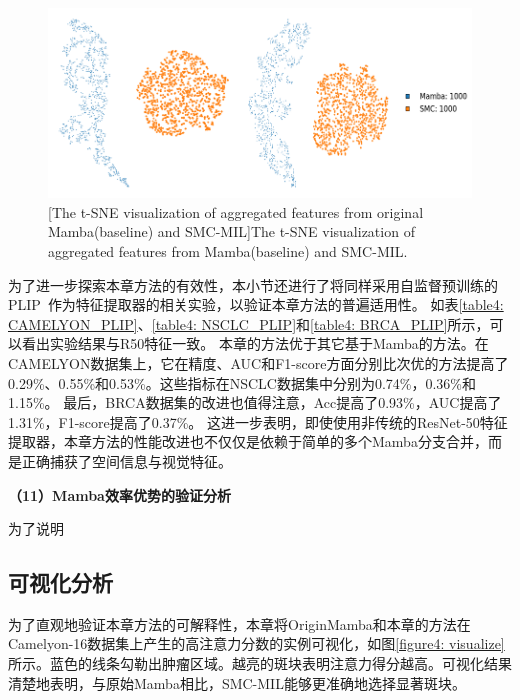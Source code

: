 \begin{figure}[h!]
  \centering
  \includegraphics[width=0.8\columnwidth]{figures/t-SNE.png}
  [The t-SNE visualization of aggregated features from original Mamba(baseline) and SMC-MIL]{The t-SNE visualization of aggregated features from Mamba(baseline) and SMC-MIL.}
  \label{figure4: tSNE}
\end{figure}


为了进一步探索本章方法的有效性，本小节还进行了将同样采用自监督预训练的PLIP~\cite{huang2023visual}作为特征提取器的相关实验，以验证本章方法的普遍适用性。
如表\ref{table4: CAMELYON_PLIP}、\ref{table4: NSCLC_PLIP}和\ref{table4: BRCA_PLIP}所示，可以看出实验结果与R50特征一致。
本章的方法优于其它基于Mamba的方法。在CAMELYON数据集上，它在精度、AUC和F1-score方面分别比次优的方法提高了0.29\%、0.55\%和0.53\%。这些指标在NSCLC数据集中分别为0.74\%，0.36\%和1.15\%。
最后，BRCA数据集的改进也值得注意，Acc提高了0.93\%，AUC提高了1.31\%，F1-score提高了0.37\%。
这进一步表明，即使使用非传统的ResNet-50特征提取器，本章方法的性能改进也不仅仅是依赖于简单的多个Mamba分支合并，而是正确捕获了空间信息与视觉特征。

\textbf{（11）Mamba效率优势的验证分析}


为了说明



\subsection[\hspace{-2pt}可视化分析]{{\heiti{} \hspace{-8pt}可视化分析}}\label{section4: 可视化分析}






为了直观地验证本章方法的可解释性，本章将OriginMamba和本章的方法在Camelyon-16数据集上产生的高注意力分数的实例可视化，如图\ref{figure4: visualize}所示。蓝色的线条勾勒出肿瘤区域。越亮的斑块表明注意力得分越高。可视化结果清楚地表明，与原始Mamba相比，SMC-MIL能够更准确地选择显著斑块。
 
